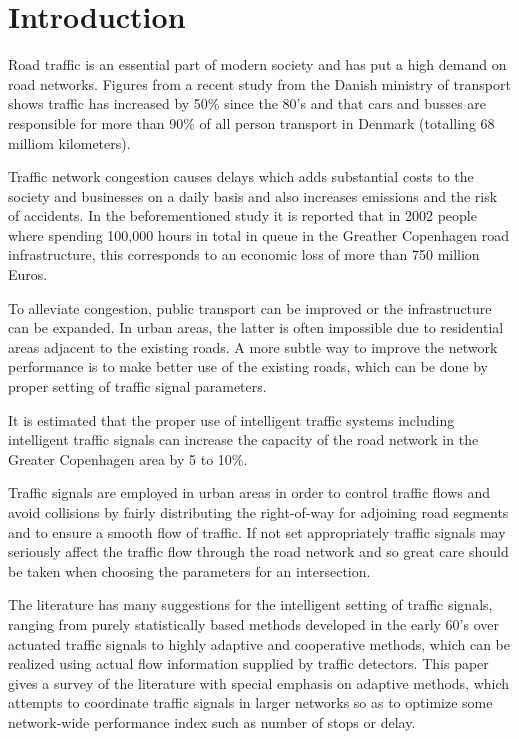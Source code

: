 \section{Introduction}

Road traffic is an essential part of modern society and has put a high
demand on road networks. Figures from a recent study from the Danish
ministry of transport \cite{47} shows traffic has increased by 50\%
since the 80's and that cars and busses are responsible for more than
90\% of all person transport in Denmark (totalling 68 milliom
kilometers).

Traffic network congestion causes delays which adds substantial costs
to the society and businesses on a daily basis and also increases
emissions and the risk of accidents. In the beforementioned study it
is reported that in 2002 people where spending 100,000 hours in total
in queue in the Greather Copenhagen road infrastructure, this
corresponds to an economic loss of more than 750 million Euros.  

To alleviate congestion, public transport can be improved or the
infrastructure can be expanded. In urban areas, the latter is often
impossible due to residential areas adjacent to the existing roads.
A more subtle way to improve the network performance is to make better
use of the existing roads, which can be done by proper setting of
traffic signal parameters.

It is estimated that the proper use of intelligent traffic systems
including intelligent traffic signals can increase the capacity of the
road network in the Greater Copenhagen area by 5 to 10\%.

Traffic signals are employed in urban areas in order to control
traffic flows and avoid collisions by fairly distributing the
right-of-way for adjoining road segments and to ensure a smooth flow
of traffic. If not set appropriately traffic signals may seriously
affect the traffic flow through the road network and so great care
should be taken when choosing the parameters for an intersection.

The literature has many suggestions for the intelligent setting of
traffic signals, ranging from purely statistically based methods
developed in the early 60's over actuated traffic signals to highly
adaptive and cooperative methods, which can be realized using actual
flow information supplied by traffic detectors. This paper gives a
survey of the literature with special emphasis on adaptive methods,
which attempts to coordinate traffic signals in larger networks so as
to optimize some network-wide performance index such as number of
stops or delay.

